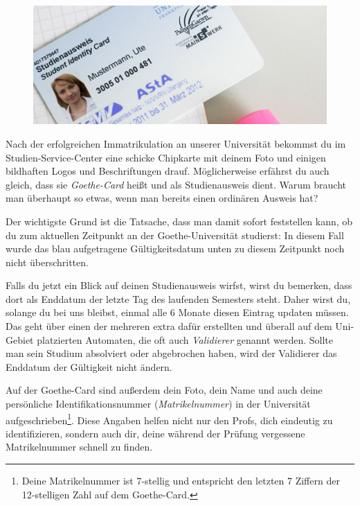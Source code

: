 \begin{figure}
     \vspace{-5mm}
  \begin{center}
     \includegraphics[scale=0.5]{bilder/goethecard}
  \end{center}
\end{figure}

Nach der erfolgreichen Immatrikulation an unserer Universität bekommst du im Studien-Service-Center eine schicke Chipkarte mit deinem Foto und einigen bildhaften Logos und Beschriftungen drauf. Möglicherweise erfährst du auch gleich, dass sie \emph{Goethe-Card} heißt und als Studienausweis dient. Warum braucht man überhaupt so etwas, wenn man bereits einen ordinären Ausweis hat?

Der wichtigste Grund ist die Tatsache, dass man damit sofort feststellen kann, ob du zum aktuellen Zeitpunkt an der Goethe-Universität studierst: In diesem Fall wurde das blau aufgetragene Gültigkeitsdatum unten zu diesem Zeitpunkt noch nicht überschritten. 

Falls du jetzt ein Blick auf deinen Studienausweis wirfst, wirst du bemerken, dass dort als Enddatum der letzte Tag des laufenden Semesters steht. Daher wirst du, solange du bei uns bleibst, einmal alle 6 Monate diesen Eintrag updaten müssen. Das geht über einen der mehreren extra dafür erstellten und überall auf dem Uni-Gebiet platzierten Automaten, die oft auch \emph{Validierer} genannt werden. Sollte man sein Studium absolviert oder abgebrochen haben, wird der Validierer das Enddatum der Gültigkeit nicht ändern.

Auf der Goethe-Card sind außerdem dein Foto, dein Name und auch deine persönliche Identifikationsnummer (\emph{Matrikelnummer}) in der Universität aufgeschrieben\footnote{Deine Matrikelnummer ist 7-stellig und entspricht den letzten 7 Ziffern der 12\hbox{-}stelligen Zahl auf dem Goethe-Card.}. Diese Angaben helfen nicht nur den Profs, dich eindeutig zu identifizieren, sondern auch dir, deine während der Prüfung vergessene Matrikelnummer schnell zu finden.

